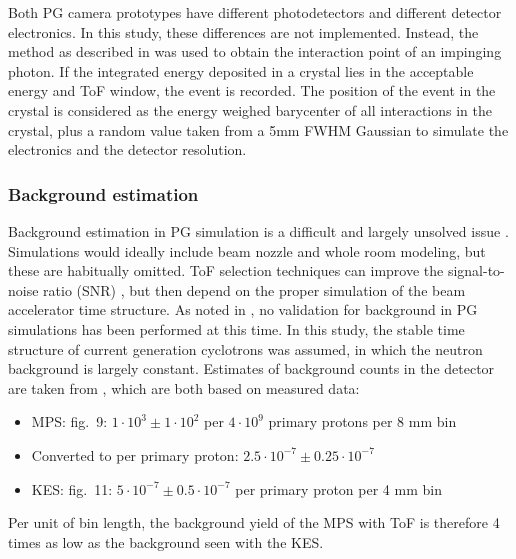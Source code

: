 \documentclass[a4paper,english]{article}
\begin{document}
Both PG camera prototypes have different photodetectors and different detector electronics. In this study, these differences are not implemented. Instead, the method as described in \cite{Gueth2013} was used to obtain the interaction point of an impinging photon. If the integrated energy deposited in a crystal lies in the acceptable energy and ToF window, the event is recorded. The position of the event in the crystal is considered as the energy weighed barycenter of all interactions in the crystal, plus a random value taken from a 5mm FWHM Gaussian to simulate the electronics and the detector resolution.

\subsubsection{Background estimation}

Background estimation in PG simulation is a difficult and largely unsolved issue \citep{Huisman2016,Sterpin2015,Pinto2014a,Perali2014}. Simulations would ideally include beam nozzle and whole room modeling, but these are habitually omitted. ToF selection techniques can improve the signal-to-noise ratio (SNR) \citep{Testa2008}, but then depend on the proper simulation of the beam accelerator time structure. As noted in \cite{Huisman2016}, no validation for background in PG simulations has been performed at this time. In this study, the stable time structure of current generation cyclotrons was assumed, in which the neutron background is largely constant. Estimates of background counts in the detector are taken from \cite{Pinto2014a,Perali2014}, which are both based on measured data:

\begin{itemize}[noitemsep]
\item MPS: \cite{Pinto2014a} fig.~9: $1 \cdot 10^{3} \pm 1 \cdot 10^{2}$ per $4\cdot10^9$ primary protons per 8 mm bin
\item[] Converted to per primary proton: $2.5 \cdot 10^{-7} \pm 0.25 \cdot 10^{-7}$
\item KES: \cite{Perali2014} fig.~11: $5 \cdot 10^{-7} \pm 0.5 \cdot 10^{-7}$ per primary proton per 4 mm bin
\end{itemize}

Per unit of bin length, the background yield of the MPS with ToF is therefore 4 times as low as the background seen with the KES.


\end{document}
